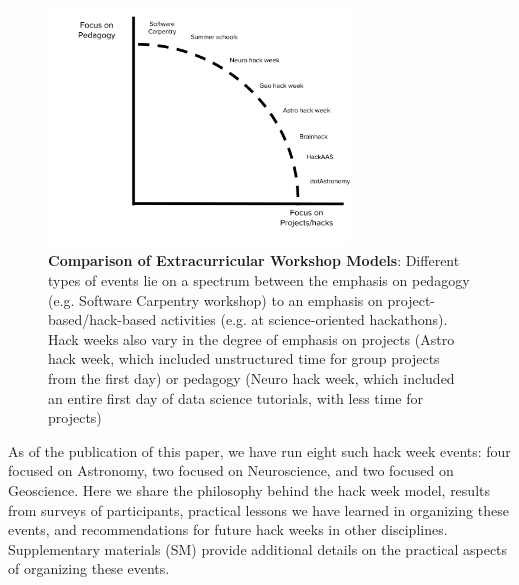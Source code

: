 \begin{figure}
\begin{center}
\includegraphics[width=8cm]{NewHackSpectrum.pdf}
\caption{{\bf Comparison of Extracurricular Workshop Models}: Different types of events lie on a spectrum between the emphasis on pedagogy (e.g. Software Carpentry workshop) to an emphasis on project-based/hack-based activities (e.g. at science-oriented hackathons). Hack weeks also vary in the degree of emphasis on projects (Astro hack week, which included unstructured time for group projects from the first day) or pedagogy (Neuro hack week, which included an entire first day of data science tutorials, with less time for projects)}
\label{fig:hackspectrum}
\end{center}
\end{figure}

As of the publication of this paper, we have run eight such hack week events: four focused on Astronomy, two focused on Neuroscience, and two focused on Geoscience.
Here we share the philosophy behind the hack week model, results from surveys of participants, practical lessons we have learned in organizing these events, and recommendations for future hack weeks in other disciplines. Supplementary materials (SM) provide additional details on the practical aspects of organizing these events.
